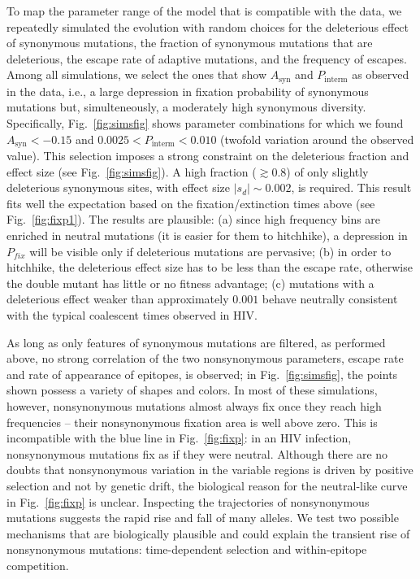 \documentclass[rmp, twocolumn]{revtex4}
\newcommand{\pfix}{P_{fix}}
\newcommand{\FIG}[1]{Fig.~\ref{fig:#1}}
\begin{document}
To map the parameter range of the model that is compatible with the data, we
repeatedly simulated the evolution with random choices for the deleterious
effect of synonymous mutations, the fraction of synonymous mutations that are
deleterious, the escape rate of adaptive mutations, and the frequency of
escapes.  Among all simulations, we select the ones that show $A_\text{syn}$ and
$P_\text{interm}$ as observed in the data, i.e., a large depression in fixation
probability of synonymous mutations but, simulteneously, a moderately high
synonymous diversity. Specifically, \FIG{simsfig} shows parameter combinations
for which we found $A_\text{syn} < -0.15$ and $0.0025 < P_\text{interm} < 0.010$
(twofold variation around the observed value). This selection imposes a strong
constraint on the deleterious fraction and effect size (see \FIG{simsfig}).
A high fraction ($\gtrsim 0.8$) of only slightly deleterious synonymous sites,
with effect size $|s_d| \sim 0.002$, is required. This result fits well the
expectation based on the fixation/extinction times above (see \FIG{fixp1}).
The results are plausible:
(a) since high frequency bins are enriched in neutral mutations (it is easier
for them to hitchhike), a depression in $\pfix$ will be
visible only if deleterious mutations are pervasive; (b) in order to
hitchhike, the deleterious effect size has to be less than the escape rate, otherwise the
double mutant has little or no fitness advantage; (c) mutations with a 
deleterious effect weaker than approximately $0.001$ behave neutrally
consistent with the typical coalescent times observed in HIV.

As long as only features of synonymous mutations are filtered, as performed
above, no strong correlation of the two nonsynonymous parameters, escape rate
and rate of appearance of epitopes, is observed; in \FIG{simsfig}, the points
shown possess a variety of shapes and colors. In most of these simulations, 
however, nonsynonymous mutations almost always fix once they reach high frequencies
-- their nonsynonymous fixation area is well above zero. This is incompatible
with the blue line in \FIG{fixp}: in an HIV infection, nonsynonymous mutations fix as if they
were neutral. Although there are no doubts that nonsynonymous variation in the
variable regions is driven by positive selection and not by genetic drift, the
biological reason for the neutral-like curve in \FIG{fixp} is unclear.
Inspecting the trajectories of nonsynonymous mutations
suggests the rapid rise and fall of many alleles. We test two possible
mechanisms that are biologically plausible and could explain the transient rise
of nonsynonymous mutations: time-dependent selection and within-epitope
competition.
\end{document}
